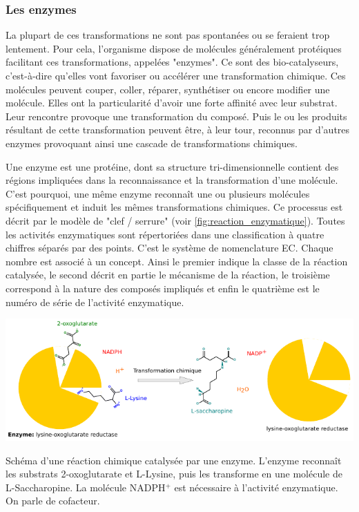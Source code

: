 \begin{refsegment}
    
    \subsubsection{Les enzymes}    
    La plupart de ces transformations ne sont pas spontanées ou se feraient trop lentement. Pour cela, l'organisme dispose de molécules généralement protéiques facilitant ces transformations, appelées "enzymes". Ce sont des bio-catalyseurs, c'est-à-dire qu'elles vont favoriser ou accélérer une transformation chimique. Ces molécules peuvent couper, coller, réparer, synthétiser ou encore modifier une molécule. Elles ont la particularité d'avoir une forte affinité avec leur substrat.  Leur rencontre provoque une transformation du composé. Puis le ou les produits résultant de cette transformation peuvent être, à leur tour, reconnus par d'autres enzymes provoquant ainsi une cascade de transformations chimiques. 
    
    Une enzyme est une protéine, dont sa structure tri-dimensionnelle contient des régions impliquées dans la reconnaissance et la transformation d'une molécule. C'est pourquoi, une même enzyme reconnaît une ou plusieurs molécules spécifiquement et induit les mêmes transformations chimiques. Ce processus est décrit par le modèle de "clef / serrure" (voir \cref{fig:reaction_enzymatique}). Toutes les activités enzymatiques sont répertoriées dans une classification à quatre chiffres séparés par des points. C'est le système de nomenclature \acrfull{EC}. Chaque nombre est associé à un concept. Ainsi le premier indique la classe de la réaction catalysée, le second décrit en partie le mécanisme de la réaction, le troisième correspond à la nature des composés impliqués et enfin le quatrième est le numéro de série de l'activité enzymatique.
    
    \begin{shadedfigure}[H]
        \centering
        \includegraphics[width=\textwidth]{img/lysine-oxoglutarate_reductase.pdf}
        \caption{Schéma d'une réaction chimique catalysée par une enzyme. L'enzyme reconnaît les substrats 2-oxoglutarate et L-Lysine, puis les transforme en une molécule de L-Saccharopine. La molécule NADPH$^{+}$ est nécessaire à l'activité enzymatique. On parle de cofacteur.}
        \label{fig:reaction_enzymatique}
    \end{shadedfigure}
    

\end{refsegment}
